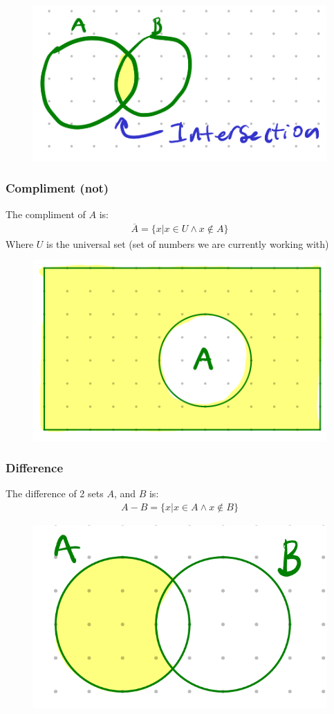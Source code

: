 \documentclass[12pt,letterpaper]{article} \usepackage{amsmath} \usepackage{graphicx}  \usepackage{longtable}  \usepackage{amssymb}
\begin{document}
            \begin{figure}[H]
                \centering
                \includegraphics[width=0.3\linewidth]{intersection.png}
            \end{figure}

            \subsubsection{Compliment (not)}
            The compliment of $A$ is: 
            \begin{align*}
                \overline{A} = \{x | x\in U \land x \notin A\}
            \end{align*}
            Where $U$ is the universal set (set of numbers we are currently working with)

            \begin{figure}[H]
                \centering
                \includegraphics[width=0.3\linewidth]{compliment.png}
            \end{figure}

            \subsubsection{Difference}
            The difference of 2 sets $A$, and $B$ is:
            \begin{align*}
                A-B = \{x | x\in A \land x \notin B\}
            \end{align*}

            \begin{figure}[H]
                \centering
                \includegraphics[width=0.3\linewidth]{difference.png}
            \end{figure}
\end{document}
